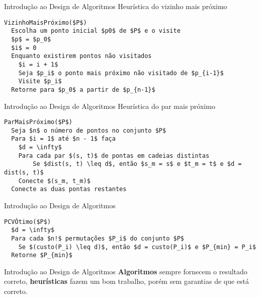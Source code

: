 \begin{frame}[fragile]{Introdução ao Design de Algoritmos}
    \Large Heurística do vizinho mais próximo
    \normalsize
    \begin{lstlisting}
VizinhoMaisPróximo($P$)
  Escolha um ponto inicial $p0$ de $P$ e o visite
  $p$ = $p_0$
  $i$ = 0
  Enquanto existirem pontos não visitados
    $i = i + 1$
    Seja $p_i$ o ponto mais próximo não visitado de $p_{i-1}$
    Visite $p_i$
  Retorne para $p_0$ a partir de $p_{n-1}$
    \end{lstlisting}
\end{frame}

\begin{frame}[fragile]{Introdução ao Design de Algoritmos}
    \Large Heurística do par mais próximo
    \normalsize
    \begin{lstlisting}
ParMaisPróximo($P$)
  Seja $n$ o número de pontos no conjunto $P$
  Para $i = 1$ até $n - 1$ faça
    $d = \infty$
    Para cada par $(s, t)$ de pontas em cadeias distintas
        Se $dist(s, t) \leq d$, então $s_m = s$ e $t_m = t$ e $d = dist(s, t)$
    Conecte $(s_m, t_m)$
  Conecte as duas pontas restantes
    \end{lstlisting}
\end{frame}

\begin{frame}[fragile]{Introdução ao Design de Algoritmos}
    \begin{lstlisting}
PCVÓtimo($P$)
  $d = \infty$
  Para cada $n!$ permutações $P_i$ do conjunto $P$
    Se $(custo(P_i) \leq d)$, então $d = custo(P_i)$ e $P_{min} = P_i$
  Retorne $P_{min}$
    \end{lstlisting}
    
    
    \bigskip
    
    
    \bigskip
    
\end{frame}

\begin{frame}{Introdução ao Design de Algoritmos}
    \huge
    \textbf{Algoritmos} \alert{sempre} fornecem o resultado correto, \textbf{heurísticas} fazem um bom trabalho, porém sem garantias de que está correto.
\end{frame}

